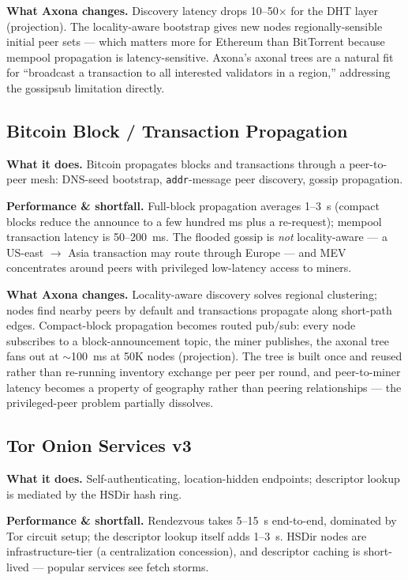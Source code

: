 \documentclass[nobib]{tufte-handout}
\begin{document}
\textbf{What Axona changes.} Discovery latency drops 10--50$\times$ for
the DHT layer (projection). The locality-aware bootstrap gives new
nodes regionally-sensible initial peer sets --- which matters more for
Ethereum than BitTorrent because mempool propagation is
latency-sensitive. Axona's axonal trees are a natural fit for
``broadcast a transaction to all interested validators in a region,''
addressing the gossipsub limitation directly.

\subsection{Bitcoin Block / Transaction Propagation}

\textbf{What it does.} Bitcoin propagates blocks and transactions
through a peer-to-peer mesh: DNS-seed bootstrap, \texttt{addr}-message
peer discovery, gossip propagation.

\textbf{Performance \& shortfall.} Full-block propagation averages
1--3~s (compact blocks reduce the announce to a few hundred ms plus a
re-request); mempool transaction latency is 50--200~ms. The flooded
gossip is \emph{not} locality-aware --- a US-east $\to$ Asia transaction
may route through Europe --- and MEV concentrates around peers with
privileged low-latency access to miners.

\textbf{What Axona changes.} Locality-aware discovery solves regional
clustering; nodes find nearby peers by default and transactions
propagate along short-path edges. Compact-block propagation becomes
routed pub/sub: every node subscribes to a block-announcement topic,
the miner publishes, the axonal tree fans out at $\sim$100~ms at 50K
nodes (projection). The tree is built once and reused rather than
re-running inventory exchange per peer per round, and peer-to-miner
latency becomes a property of geography rather than peering
relationships --- the privileged-peer problem partially dissolves.

\subsection{Tor Onion Services v3}

\textbf{What it does.} Self-authenticating, location-hidden endpoints;
descriptor lookup is mediated by the HSDir hash ring.

\textbf{Performance \& shortfall.} Rendezvous takes 5--15~s end-to-end,
dominated by Tor circuit setup; the descriptor lookup itself adds
1--3~s. HSDir nodes are infrastructure-tier (a centralization
concession), and descriptor caching is short-lived --- popular services
see fetch storms.
\end{document}
